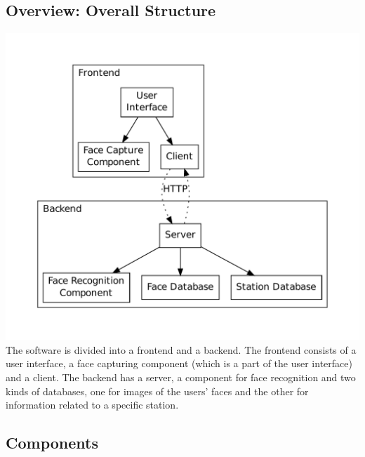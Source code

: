 \documentclass[11pt]{article}
\begin{document}
\subsection{Overview: Overall Structure}
\includegraphics[scale=0.5]{components.pdf}\\
The software is divided into a frontend and a backend. The frontend consists of a user interface,
a face capturing component (which is a part of the user interface) and a client. The backend has
a server, a component for face recognition and two kinds of databases, one for images of the users'
faces and the other for information related to a specific station.

\subsection{Components}

\end{document}
